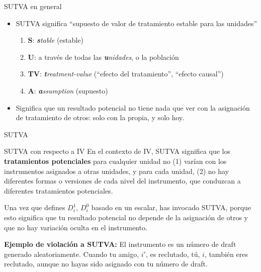 \documentclass{beamer}
\begin{document}
\begin{frame}{SUTVA en general}

  \begin{itemize}
    \item SUTVA significa ``supuesto de valor de tratamiento estable para las unidades''
          \begin{enumerate}
            \item \textbf{S}: \emph{\textbf{s}table} (estable)
            \item \textbf{U}: a través de todas las \emph{\textbf{u}nidades}, o la población
            \item \textbf{TV}: \emph{\textbf{t}reatment-value} (``efecto del tratamiento'', ``efecto causal'')
            \item \textbf{A}: \emph{\textbf{a}ssumption} (supuesto)
          \end{enumerate}
    \item Significa que un resultado potencial no tiene nada que ver con la asignación de tratamiento de otros: solo con la propia, y solo hoy.
  \end{itemize}
\end{frame}





\begin{frame}{SUTVA}

\begin{block}{SUTVA con respecto a IV}
En el contexto de IV, SUTVA significa que los \textbf{tratamientos potenciales} para cualquier unidad no (1) varían con los instrumentos asignados a otras unidades, y para cada unidad, (2) no hay diferentes formas o versiones de cada nivel del instrumento, que conduzcan a diferentes tratamientos potenciales.
\end{block}

\bigskip

Una vez que defines $D^1_i$, $D^0_i$ basado en un escalar, has invocado SUTVA, porque esto significa que tu resultado potencial no depende de la asignación de otros y que no hay variación oculta en el instrumento.

\bigskip

{\small\textbf{Ejemplo de violación a SUTVA:} El instrumento es un número de draft generado aleatoriamente. Cuando tu amigo, $i'$, es reclutado, tú, $i$, también eres reclutado, aunque no hayas sido asignado con tu número de draft.}
\end{frame}
\end{document}
